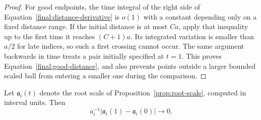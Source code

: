 \begin{proof}
For good endpoints, the time integral of the right side of
Equation~\eqref{final:distance-derivative} is $o(1)$ with a constant
depending only on a fixed distance range.  If the initial distance
is at most $Ca$, apply that inequality up to the first time it
reaches $(C+1)a$.  Its integrated variation is smaller than $a/2$
for late indices, so such a first crossing cannot occur.  The same
argument backwards in time treats a pair initially specified at
$t=1$.  This proves Equation~\eqref{final:good-distance}, and also
prevents points outside a larger bounded scaled ball from entering
a smaller one during the comparison.
\end{proof}

\begin{proposition}
\label{final:root-fixed}
Let $\mathfrak a_i(t)$ denote the root scale of
Proposition~\ref{prop:root-scale}, computed in interval units.  Then
\[
 a_i^{-1}\bigl|\mathfrak a_i(1)-\mathfrak a_i(0)\bigr|
                      \longrightarrow0.
\]
\end{proposition}

